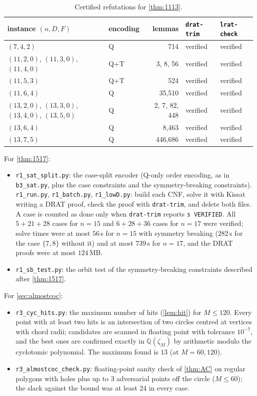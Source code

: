 \documentclass[11pt]{amsart}
\theoremstyle{definition}
\theoremstyle{remark}
\begin{document}
\begin{table}[ht]
\centering
\renewcommand{\arraystretch}{1.15}
\begin{tabular}{@{}llrll@{}}
\toprule
instance $(n,D,F)$ & encoding & lemmas & \texttt{drat-trim} & \texttt{lrat-check}\\
\midrule
$(7,4,2)$ & Q & 714 & verified & verified\\
$(11,2,0)$, $(11,3,0)$, $(11,4,0)$ & Q+T & 3, 8, 56 & verified & verified\\
$(11,5,3)$ & Q+T & 524 & verified & verified\\
$(11,6,4)$ & Q & 35,510 & verified & verified\\
$(13,2,0)$, $(13,3,0)$, $(13,4,0)$, $(13,5,0)$ & Q & 2, 7, 82, 448 & verified & verified\\
$(13,6,4)$ & Q & 8,463 & verified & verified\\
$(13,7,5)$ & Q & 446,686 & verified & verified\\
\bottomrule
\end{tabular}
\caption{Certified refutations for \cref{thm:1113}.}
\end{table}

For \cref{thm:1517}:
\begin{itemize}[leftmargin=2em]
\item \texttt{r1\_sat\_split.py}: the case-split encoder (Q-only order encoding, as in \texttt{b3\_sat.py}, plus the case constraints and the symmetry-breaking constraints). \texttt{r1\_run.py}, \texttt{r1\_batch.py}, \texttt{r1\_lowD.py}: build each CNF, solve it with Kissat writing a DRAT proof, check the proof with \texttt{drat-trim}, and delete both files. A case is counted as done only when \texttt{drat-trim} reports \texttt{s VERIFIED}. All $5+21+28$ cases for $n=15$ and $6+28+36$ cases for $n=17$ were verified; solve times were at most $56$\,s for $n=15$ with symmetry breaking ($282$\,s for the case $\{7,8\}$ without it) and at most $739$\,s for $n=17$, and the DRAT proofs were at most $124$\,MB.
\item \texttt{r1\_sb\_test.py}: the orbit test of the symmetry-breaking constraints described after \cref{thm:1517}.
\end{itemize}

For \cref{sec:almostcoc}:
\begin{itemize}[leftmargin=2em]
\item \texttt{r3\_cyc\_hits.py}: the maximum number of hits (\cref{lem:hit}) for $M\le120$. Every point with at least two hits is an intersection of two circles centred at vertices with chord radii; candidates are scanned in floating point with tolerance $10^{-7}$, and the best ones are confirmed exactly in $\mathbb Q(\zeta_M)$ by arithmetic modulo the cyclotomic polynomial. The maximum found is $13$ (at $M=60,120$).
\item \texttt{r3\_almostcoc\_check.py}: floating-point sanity check of \cref{thm:AC} on regular polygons with holes plus up to $3$ adversarial points off the circle ($M\le60$); the slack against the bound was at least $24$ in every case.
\end{itemize}
\end{document}
